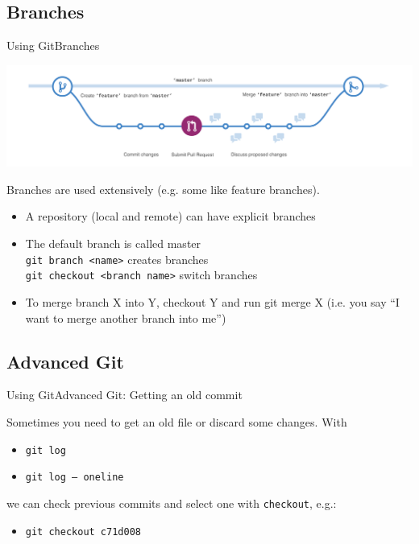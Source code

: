 \documentclass[10pt,compress]{beamer} %
\begin{document}
\subsection{Branches}
\begin{frame}{Using Git}{Branches}

\centering \includegraphics[width=.8\textwidth]{figs/branching}

Branches are used extensively (e.g. some like feature branches).

\begin{itemize}
 \item A repository (local and remote) can have explicit branches
 \item The default branch is called \alert{master}\\
 		\texttt{git branch <name>} creates branches\\
  		\texttt{git checkout <branch name>} switch branches\\
 \item To merge branch X into Y, checkout Y and run git merge X
(i.e. you say “I want to merge another branch into me”)
\end{itemize}

\end{frame}


\subsection{Advanced Git}
\begin{frame}{Using Git}{Advanced Git: Getting an old commit}

Sometimes you need to get an old file or discard some changes. With 

\begin{itemize}
 \item \texttt{git log} 
 \item \texttt{git log -- oneline}
\end{itemize}

we can check previous commits and select one with \texttt{checkout}, e.g.:
\begin{itemize}
 \item \texttt{git checkout c71d008}
\end{itemize}

\end{frame}
\end{document}

